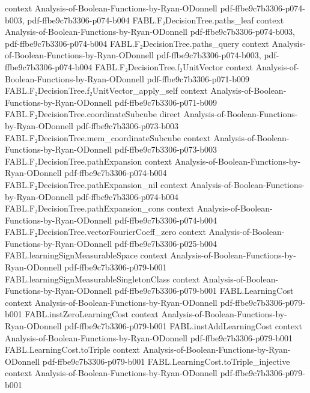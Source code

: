 \begin{theorem}
  {context}
  {Analysis-of-Boolean-Functions-by-Ryan-ODonnell}
  {pdf-ffbe9c7b3306-p074-b003,
    pdf-ffbe9c7b3306-p074-b004}
\proofstep
  {FABL.F₂DecisionTree.paths_leaf}
  {context}
  {Analysis-of-Boolean-Functions-by-Ryan-ODonnell}
  {pdf-ffbe9c7b3306-p074-b003,
    pdf-ffbe9c7b3306-p074-b004}
\proofstep
  {FABL.F₂DecisionTree.paths_query}
  {context}
  {Analysis-of-Boolean-Functions-by-Ryan-ODonnell}
  {pdf-ffbe9c7b3306-p074-b003,
    pdf-ffbe9c7b3306-p074-b004}
\proofstep
  {FABL.F₂DecisionTree.f₂UnitVector}
  {context}
  {Analysis-of-Boolean-Functions-by-Ryan-ODonnell}
  {pdf-ffbe9c7b3306-p071-b009}
\proofstep
  {FABL.F₂DecisionTree.f₂UnitVector_apply_self}
  {context}
  {Analysis-of-Boolean-Functions-by-Ryan-ODonnell}
  {pdf-ffbe9c7b3306-p071-b009}
\proofstep
  {FABL.F₂DecisionTree.coordinateSubcube}
  {direct}
  {Analysis-of-Boolean-Functions-by-Ryan-ODonnell}
  {pdf-ffbe9c7b3306-p073-b003}
\proofstep
  {FABL.F₂DecisionTree.mem_coordinateSubcube}
  {context}
  {Analysis-of-Boolean-Functions-by-Ryan-ODonnell}
  {pdf-ffbe9c7b3306-p073-b003}
\proofstep
  {FABL.F₂DecisionTree.pathExpansion}
  {context}
  {Analysis-of-Boolean-Functions-by-Ryan-ODonnell}
  {pdf-ffbe9c7b3306-p074-b004}
\proofstep
  {FABL.F₂DecisionTree.pathExpansion_nil}
  {context}
  {Analysis-of-Boolean-Functions-by-Ryan-ODonnell}
  {pdf-ffbe9c7b3306-p074-b004}
\proofstep
  {FABL.F₂DecisionTree.pathExpansion_cons}
  {context}
  {Analysis-of-Boolean-Functions-by-Ryan-ODonnell}
  {pdf-ffbe9c7b3306-p074-b004}
\proofstep
  {FABL.F₂DecisionTree.vectorFourierCoeff_zero}
  {context}
  {Analysis-of-Boolean-Functions-by-Ryan-ODonnell}
  {pdf-ffbe9c7b3306-p025-b004}
\proofstep
  {FABL.learningSignMeasurableSpace}
  {context}
  {Analysis-of-Boolean-Functions-by-Ryan-ODonnell}
  {pdf-ffbe9c7b3306-p079-b001}
\proofstep
  {FABL.learningSignMeasurableSingletonClass}
  {context}
  {Analysis-of-Boolean-Functions-by-Ryan-ODonnell}
  {pdf-ffbe9c7b3306-p079-b001}
\proofstep
  {FABL.LearningCost}
  {context}
  {Analysis-of-Boolean-Functions-by-Ryan-ODonnell}
  {pdf-ffbe9c7b3306-p079-b001}
\proofstep
  {FABL.instZeroLearningCost}
  {context}
  {Analysis-of-Boolean-Functions-by-Ryan-ODonnell}
  {pdf-ffbe9c7b3306-p079-b001}
\proofstep
  {FABL.instAddLearningCost}
  {context}
  {Analysis-of-Boolean-Functions-by-Ryan-ODonnell}
  {pdf-ffbe9c7b3306-p079-b001}
\proofstep
  {FABL.LearningCost.toTriple}
  {context}
  {Analysis-of-Boolean-Functions-by-Ryan-ODonnell}
  {pdf-ffbe9c7b3306-p079-b001}
\proofstep
  {FABL.LearningCost.toTriple_injective}
  {context}
  {Analysis-of-Boolean-Functions-by-Ryan-ODonnell}
  {pdf-ffbe9c7b3306-p079-b001}

\end{theorem}
